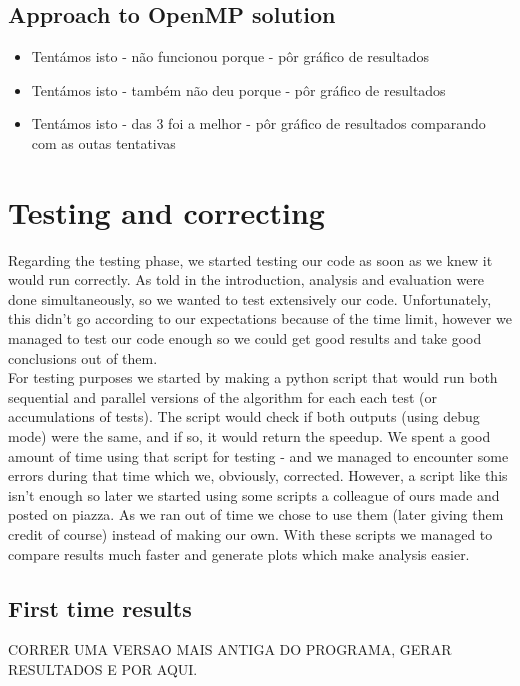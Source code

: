\documentclass[10pt,journal,compsoc]{IEEEtran}
\begin{document}
\subsection{Approach to OpenMP solution}
\begin{itemize}
    \item Tentámos isto - não funcionou porque - pôr gráfico de resultados
    \item Tentámos isto - também não deu porque - pôr gráfico de resultados
    \item Tentámos isto - das 3 foi a melhor - pôr gráfico de resultados comparando com as outas tentativas
\end{itemize}

\section{Testing and correcting}
Regarding the testing phase, we started testing our code as soon as we knew it would run correctly. As told in the introduction, analysis and evaluation were done simultaneously, so we wanted to test extensively our code. Unfortunately, this didn't go according to our expectations because of the time limit, however we managed to test our code enough so we could get good results and take good conclusions out of them.
\\
For testing purposes we started by making a python script that would run both sequential and parallel versions of the algorithm for each each test (or accumulations of tests). The script would check if both outputs (using debug mode) were the same, and if so, it would return the speedup. We spent a good amount of time using that script for testing - and we managed to encounter some errors during that time which we, obviously, corrected. However, a script like this isn't enough so later we started using some scripts a colleague of ours made and posted on piazza. As we ran out of time we chose to use them (later giving them credit of course) instead of making our own. With these scripts we managed to compare results much faster and generate plots which make analysis easier.

\subsection{First time results}
CORRER UMA VERSAO MAIS ANTIGA DO PROGRAMA, GERAR RESULTADOS E POR AQUI.
\end{document}
